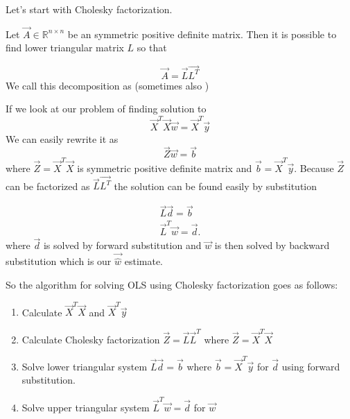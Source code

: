 Let's start with Cholesky factorization.
\begin{definition}
	Let $\vec{A} \in \mathbb{R}^{n \times n}$ be an symmetric positive definite matrix. Then it is possible to find lower triangular matrix $L$ so that 

	\begin{equation}
		\vec{A} = \vec{L}\vec{L^T}
	\end{equation}
	We call this decomposition as  (sometimes also  )
\end{definition}
	
If we look at our problem of finding solution to 
\begin{equation}
	\vec{X}^T\vec{X}\vec{w} = \vec{X}^T\vec{y}
\end{equation}
We can easily rewrite it as 
\begin{equation}
	\vec{Z}\vec{w} = \vec{b}
\end{equation}
where $\vec{Z} = \vec{X}^T\vec{X}$ is symmetric positive definite matrix and $\vec{b} = \vec{X}^T\vec{y} $. Because $\vec{Z}$ can be factorized as $\vec{L}\vec{L^T}$ the solution can be found easily by substitution

\begin{align}
	\vec{L}\vec{d} = \vec{b} \\
	\vec{L}^T\vec{w} = \vec{d}.
\end{align}
where $\vec{d}$ is solved by forward substitution and $\vec{w}$ is then solved by backward substitution which is our $\vec{\hat{w}}$ estimate.

So the algorithm for solving OLS using Cholesky factorization goes as follows:
\begin{enumerate}
  \item Calculate $\vec{X}^T\vec{X}$ and   $\vec{X}^T\vec{y}$ 
  \item Calculate Cholesky factorization $\vec{Z} = \vec{L}\vec{L}^T$ where $\vec{Z} = \vec{X}^T\vec{X}$
  \item Solve lower triangular system $\vec{L}\vec{d} = \vec{b}$  where $ \vec{b} = \vec{X}^T\vec{y}$  for $\vec{d}$ using forward substitution.
  \item Solve upper triangular system $	\vec{L}^T\vec{w} = \vec{d}$ for $\vec{w}$
\end{enumerate}

